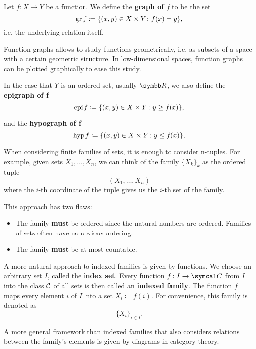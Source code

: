 \begin{definition}\label{def:function_graphs}
  Let \( f: X \to Y \) be a function. We define the \textbf{graph of \( f \)} to be the set
  \begin{equation*}
    \operatorname{gr} f \coloneqq \{ (x, y) \in X \times Y \colon f(x) = y \},
  \end{equation*}
  i.e. the underlying relation itself.

  Function graphs allows to study functions geometrically, i.e. as subsets of a space with a certain geometric structure. In low-dimensional spaces, function graphs can be plotted graphically to ease this study.

  In the case that \( Y \) is an ordered set, usually \( \BB{R} \), we also define the \textbf{epigraph of f}
  \begin{equation*}
    \operatorname{epi} f \coloneqq \{ (x, y) \in X \times Y \colon y \geq f(x) \},
  \end{equation*}

  and the \textbf{hypograph of f}
  \begin{equation*}
    \operatorname{hyp} f \coloneqq \{ (x, y) \in X \times Y \colon y \leq f(x) \},
  \end{equation*}
\end{definition}

\begin{definition}\label{def:indexed_family}
  When considering finite families of sets, it is enough to consider n-tuples. For example, given sets \( X_1, \ldots, X_n \), we can think of the family \( \{ X_k \}_k \) as the ordered tuple
  \begin{equation*}
    (X_1, \ldots, X_n)
  \end{equation*}
  where the \( i \)-th coordinate of the tuple gives us the \( i \)-th set of the family.

  This approach has two flaws:
  \begin{itemize}
    \item The family \textbf{must} be ordered since the natural numbers are ordered. Families of sets often have no obvious ordering.
    \item The family \textbf{must} be at most countable.
  \end{itemize}

  A more natural approach to indexed families is given by functions. We choose an arbitrary set \( I \), called the \textbf{index set}. Every function \( f: I \to \Cal C \) from \( I \) into the class \( \cal C \) of all sets is then called an \textbf{indexed family}. The function \( f \) maps every element \( i \) of \( I \) into a set \( X_i \coloneqq f(i) \). For convenience, this family is denoted as
  \begin{equation*}
    \{ X_i \}_{i \in I}.
  \end{equation*}

  A more general framework than indexed families that also considers relations between the family's elements is given by diagrams in category theory.
\end{definition}

